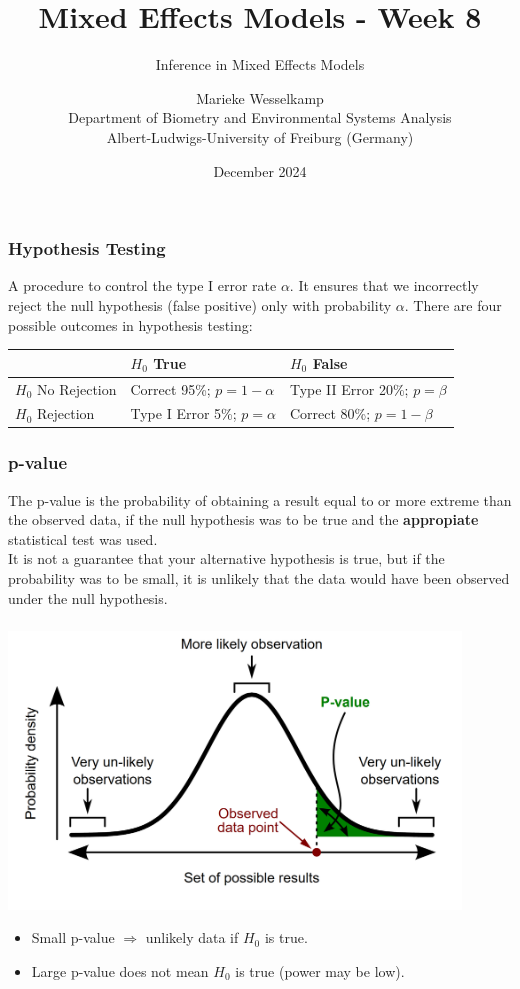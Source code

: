 \documentclass{beamer}
\title{Mixed Effects Models - Week 8}
\subtitle{Inference in Mixed Effects Models}
\author{Marieke Wesselkamp\\Department of Biometry and Environmental Systems Analysis\\Albert-Ludwigs-University of Freiburg (Germany)}
\date{December 2024}
\begin{document}
\frame{\titlepage}

\begin{frame}
    \frametitle{Hypothesis Testing}
    \large
    A procedure to control the type I error rate $\alpha$. It ensures that we incorrectly reject the null hypothesis (false positive) only with probability $\alpha$. There are four possible outcomes in hypothesis testing:
    \small
    \begin{table}[]
    \begin{tabular}{|l|l|l|}
    \hline
    \textbf{} & \textbf{$H_0$ True} & \textbf{$H_0$ False} \\
    \hline
    $H_0$ No Rejection & Correct 95\%; $p = 1 - \alpha$ & Type II Error 20\%; $p = \beta$ \\
    $H_0$ Rejection & Type I Error 5\%; $p = \alpha$ & Correct 80\%; $p = 1 - \beta$\\
    \hline
    \end{tabular}
    \end{table}
\end{frame}

\begin{frame}
    \frametitle{p-value}
    \large
    The p-value is the probability of obtaining a result equal to or more extreme than the observed data, if the null hypothesis was to be true and the \textbf{appropiate} statistical test was used. \\
    It is not a guarantee that your alternative hypothesis is true, but if the probability was to be small, it is unlikely that the data would have been observed under the null hypothesis.
    \vspace{0.2cm}
\end{frame}

\begin{frame}
\frametitle{}
    \centering
    \includegraphics[width=0.9\textwidth]{lectures/day_8_inference_in_mems/figures/p-value.png}
    \begin{itemize}
        \item Small p-value $\Rightarrow$ unlikely data if $H_0$ is true.
        \item Large p-value does not mean $H_0$ is true (power may be low).
    \end{itemize}
\end{frame}
\end{document}
